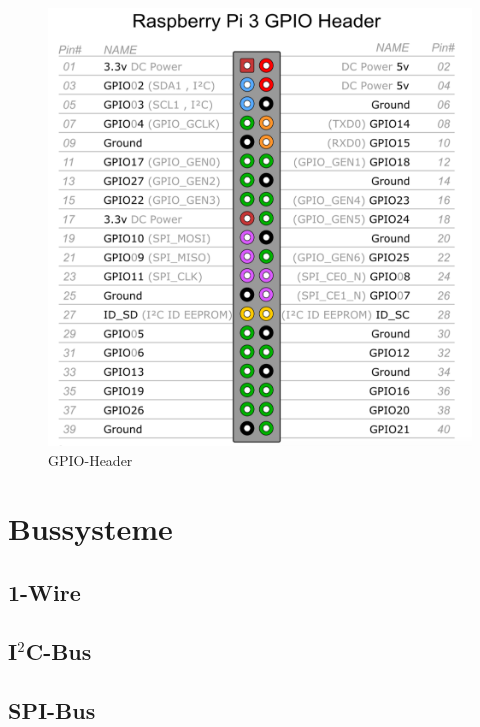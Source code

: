 \begin{figure}[!h] 
  \centering
     \includegraphics[scale=.35]{BilderAllgemein/GPIO.png}
  \caption{GPIO-Header \citep{GPIO_Header_Bild}}
  \label{Abb_Bild_GPIO}
\end{figure}

\section{Bussysteme}
\label{section_Bussysteme}

\subsection{1-Wire}
\label{subsection_1Wire}

\subsection{I$^2$C-Bus}
\label{subsection_I2C}

\subsection{SPI-Bus}
\label{subsection_SPI}